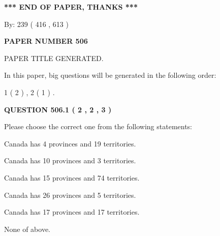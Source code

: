 \documentclass[12pt]{article}
\begin{document}
   
\vspace{1.0in} 
{\textbf{\large{ *** END OF PAPER, THANKS *** }}} 
   
   
\hspace{1.0in} By: 
 239 ( 416 ,  613 )
   
   
   
   
\newpage 
\setcounter{page}{ 
   506001 } 
   
   
   
   
 {\textbf{ \Large{ PAPER NUMBER  506  }}}
   
   
\vspace{0.2in}
   
   
   
   
   
   
   
   
 \vspace{0.2in}
 
 
 
 
   
   
 PAPER TITLE GENERATED.
   
   
   
\vspace{0.2in}
   
In this paper, big questions will be generated in the following order: 
   
   
   1 ( 2 )
 ,
   2 ( 1 )
 .
  
\vspace{0.2in}
  
{\textbf{\Large{QUESTION
506.1 
 ( 2 , 2 , 3 )
}}}
  
  
Please choose the correct one from the following statements:
 
 
Canada has   4 provinces and  19 territories.
 
 
Canada has 10  provinces and 3 territories.
 
 
Canada has  15 provinces and  74 territories.
 
 
Canada has  26 provinces and  5 territories.
 
 
Canada has  17 provinces and  17 territories.
 
 
 None of above.
 
 
\noindent{}
 
\end{document}
